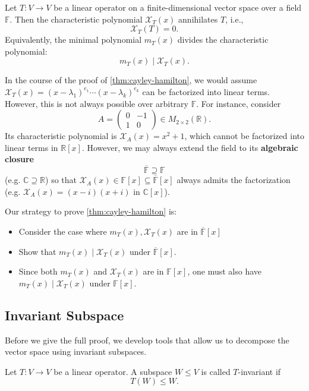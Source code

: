 \begin{theorem}\label{thm:cayley-hamilton}
Let \( T : V \to V \) be a linear operator on a finite-dimensional vector space over a field \( \mathbb{F} \). Then the characteristic polynomial \( \mathcal{X}_T(x) \) annihilates \( T \), i.e.,
\[
\mathcal{X}_T(T) = 0.
\]
Equivalently, the minimal polynomial \( m_T(x) \) divides the characteristic polynomial:
\[
m_T(x) \mid \mathcal{X}_T(x).
\]
\end{theorem}

In the course of the proof of \autoref{thm:cayley-hamilton}, we would assume 
$\mathcal{X}_T(x) = (x - \lambda_1)^{e_1} \cdots (x-\lambda_k)^{e_k}$
can be factorized into linear terms. However, this is not always possible over arbitrary \( \mathbb{F} \). For instance, consider
\[
A = \begin{pmatrix} 0 & -1 \\ 1 & 0 \end{pmatrix} \in M_{2 \times 2}(\mathbb{R}).
\]
Its characteristic polynomial is \( \mathcal{X}_A(x) = x^2 + 1 \), which cannot be factorized into linear terms in \( \mathbb{R}[x] \). However, we may always extend the field to its {\bf algebraic closure} 
\[ \overline{\mathbb{F}} \supseteq \mathbb{F} \] (e.g. $\mathbb{C} \supseteq \mathbb{R}$) so that \( \mathcal{X}_A(x) \in \mathbb{F}[x] \subseteq \overline{\mathbb{F}}[x]\) always admits the factorization (e.g. $\mathcal{X}_A(x) = (x - i)(x + i)$ in $\mathbb{C}[x]$).

Our strategy to prove \autoref{thm:cayley-hamilton} is:
\begin{itemize}
    \item Consider the case where \( m_T(x), \mathcal{X}_T(x)\) are in \(\overline{\mathbb{F}}[x]\) 
    \item Show that \(m_T(x) \mid \mathcal{X}_T(x)\) under \(\overline{\mathbb{F}}[x]\).
    \item Since both \(m_T(x)\) and \(\mathcal{X}_T(x)\) are in $\mathbb{F}[x]$, one must also have \(m_T(x) \mid \mathcal{X}_T(x)\) under \(\mathbb{F}[x]\).
\end{itemize}

\subsection{Invariant Subspace}
Before we give the full proof, we develop tools that allow us to decompose the vector space using invariant subspaces.
\begin{definition}\label{def:invariant-subspace}
Let \( T : V \to V \) be a linear operator. A subspace \( W \leq V \) is called \( T \)-invariant if
\[
T(W) \leq W.
\]
\end{definition}

